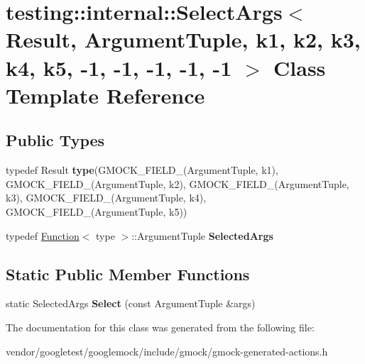 \hypertarget{classtesting_1_1internal_1_1_select_args_3_01_result_00_01_argument_tuple_00_01k1_00_01k2_00_01k6061407a5fa2cad2c495e8e16ee67874}{}\section{testing\+:\+:internal\+:\+:Select\+Args$<$ Result, Argument\+Tuple, k1, k2, k3, k4, k5, -\/1, -\/1, -\/1, -\/1, -\/1 $>$ Class Template Reference}
\label{classtesting_1_1internal_1_1_select_args_3_01_result_00_01_argument_tuple_00_01k1_00_01k2_00_01k6061407a5fa2cad2c495e8e16ee67874}
\subsection*{Public Types}
\begin{DoxyCompactItemize}
\item 
\mbox{\label{classtesting_1_1internal_1_1_select_args_3_01_result_00_01_argument_tuple_00_01k1_00_01k2_00_01k6061407a5fa2cad2c495e8e16ee67874_a64b825d66ab0457b44e260b2fd7e1946}} 
typedef Result {\bfseries type}(G\+M\+O\+C\+K\+\_\+\+F\+I\+E\+L\+D\+\_\+(Argument\+Tuple, k1), G\+M\+O\+C\+K\+\_\+\+F\+I\+E\+L\+D\+\_\+(Argument\+Tuple, k2), G\+M\+O\+C\+K\+\_\+\+F\+I\+E\+L\+D\+\_\+(Argument\+Tuple, k3), G\+M\+O\+C\+K\+\_\+\+F\+I\+E\+L\+D\+\_\+(Argument\+Tuple, k4), G\+M\+O\+C\+K\+\_\+\+F\+I\+E\+L\+D\+\_\+(Argument\+Tuple, k5))
\item 
\mbox{\label{classtesting_1_1internal_1_1_select_args_3_01_result_00_01_argument_tuple_00_01k1_00_01k2_00_01k6061407a5fa2cad2c495e8e16ee67874_adc02f2ce0bec0329a74a88e01a586ca1}} 
typedef \mbox{\hyperlink{structtesting_1_1internal_1_1_function}{Function}}$<$ type $>$\+::Argument\+Tuple {\bfseries Selected\+Args}
\end{DoxyCompactItemize}
\subsection*{Static Public Member Functions}
\begin{DoxyCompactItemize}
\item 
\mbox{\label{classtesting_1_1internal_1_1_select_args_3_01_result_00_01_argument_tuple_00_01k1_00_01k2_00_01k6061407a5fa2cad2c495e8e16ee67874_a08f454a7721b19e327042fd2bb6bf36f}} 
static Selected\+Args {\bfseries Select} (const Argument\+Tuple \&args)
\end{DoxyCompactItemize}


The documentation for this class was generated from the following file\+:\begin{DoxyCompactItemize}
\item 
vendor/googletest/googlemock/include/gmock/gmock-\/generated-\/actions.\+h\end{DoxyCompactItemize}
